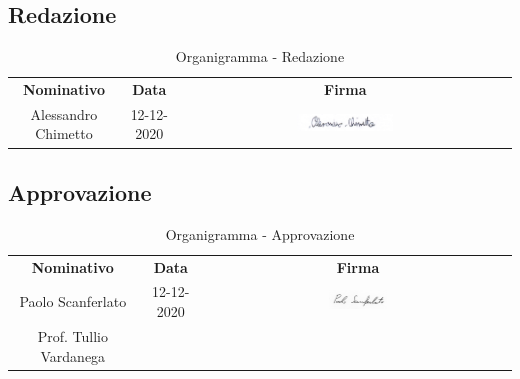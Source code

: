 
\subsection{Redazione}

\begin{table} [h!]
	\begin{center}
		\renewcommand{\arraystretch}{3}
		\begin{tabular} { c c c }
			\rowcolor{lightgray}
			\textbf{Nominativo} & \textbf{Data} & \textbf{Firma} \\
			Alessandro Chimetto & 12-12-2020 & \includegraphics[width=0.3\textwidth]{res/img/firme/alessandro_chimetto.jpg}\\
		\end{tabular}
		\caption{Organigramma - Redazione}
	\end{center}
\end{table}


\subsection{Approvazione}

\begin{table} [h!]
	\begin{center}
		\renewcommand{\arraystretch}{3}
		\begin{tabular} { c c c }
			\rowcolor{lightgray}
			\textbf{Nominativo} & \textbf{Data} & \textbf{Firma} \\
			Paolo Scanferlato & 12-12-2020 & \includegraphics[width=0.2\textwidth]{res/img/firme/paolo_scanferlato.jpg}\\
			Prof. Tullio Vardanega & & \\
		\end{tabular}
		\caption{Organigramma - Approvazione}
	\end{center}
\end{table}

\newpage

